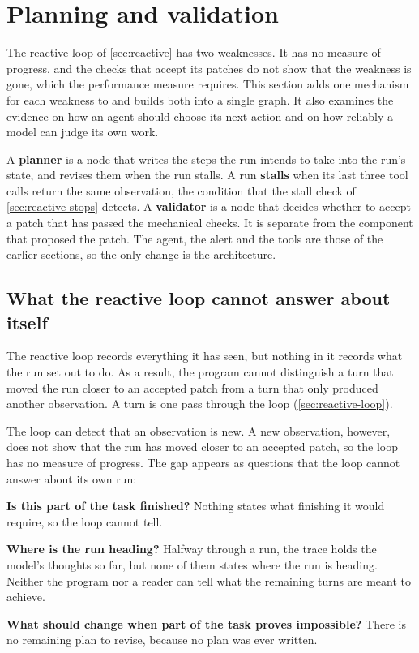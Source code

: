 \section{Planning and validation}
\label{sec:planning}

The reactive loop of \cref{sec:reactive} has two weaknesses. It has no measure of progress, and the
checks that accept its patches do not show that the weakness is gone, which the performance measure
requires. This section adds one mechanism for each weakness to \msa{} and builds both into a single
graph. It also examines the evidence on how an agent should choose its next action and on how
reliably a model can judge its own work.

A \textbf{planner} is a node that writes the steps the run intends to take into the run's state, and
revises them when the run stalls. A run \textbf{stalls} when its last three tool calls return the
same observation, the condition that the stall check of \cref{sec:reactive-stops} detects. A
\textbf{validator} is a node that decides whether to accept a patch that has passed the mechanical
checks. It is separate from the component that proposed the patch. The agent, the alert and the
tools are those of the earlier sections, so the only change is the architecture.

\subsection{What the reactive loop cannot answer about itself}
\label{sec:planning-loop-gaps}

The reactive loop records everything it has seen, but nothing in it records what the run set out to
do. As a result, the program cannot distinguish a turn that moved the run closer to an accepted patch
from a turn that only produced another observation. A turn is one pass through the loop
(\cref{sec:reactive-loop}).

The loop can detect that an observation is new. A new observation, however, does not show that the
run has moved closer to an accepted patch, so the loop has no measure of progress. The gap appears
as questions that the loop cannot answer about its own run:
\bi
\item \textbf{Is this part of the task finished?} Nothing states what finishing it would require, so
the loop cannot tell.
\item \textbf{Where is the run heading?} Halfway through a run, the trace holds the model's thoughts
so far, but none of them states where the run is heading. Neither the program nor a reader can tell
what the remaining turns are meant to achieve.
\item \textbf{What should change when part of the task proves impossible?} There is no remaining plan
to revise, because no plan was ever written.
\ei

